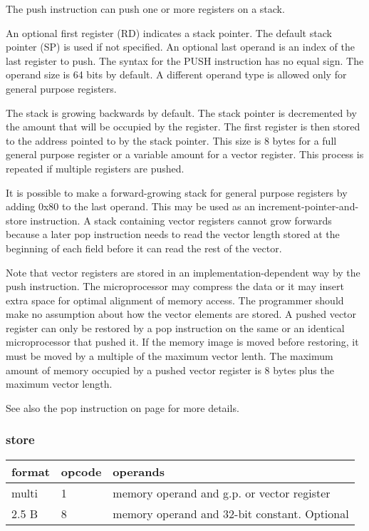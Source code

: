 \documentclass[forwardcom.tex]{subfiles}
\begin{document}
The push instruction can push one or more registers on a stack. 
\vspace{2mm}

An optional first register (RD) indicates a stack pointer. The default stack pointer (SP) is used if not specified. An optional last operand is an index of the last register to push. The syntax for the PUSH instruction has no equal sign. The operand size is 64 bits by default. A different operand type is allowed only for general purpose registers.
\vspace{2mm}

The stack is growing backwards by default. 
The stack pointer is decremented by the amount that will be occupied by the register. The first register is then stored to the address pointed to by the stack pointer. This size is 8 bytes for a full general purpose register or a variable amount for a vector register. This process is repeated if multiple registers are pushed.
\vspace{2mm}

It is possible to make a forward-growing stack for general purpose registers by adding 0x80 to the last operand. This may be used as an increment-pointer-and-store instruction. A stack containing vector registers cannot grow forwards because a later pop instruction needs to read the vector length stored at the beginning of each field before it can read the rest of the vector.
\vspace{2mm}

Note that vector registers are stored in an implementation-dependent way by the push instruction. The microprocessor may compress the data or it may insert extra space for optimal alignment of memory access. The programmer should make no assumption about how the vector elements are stored. A pushed vector register can only be restored by a pop instruction on the same or an identical microprocessor that pushed it. If the memory image is moved before restoring, it must be moved by a multiple of the maximum vector lenth. The maximum amount of memory occupied by a pushed vector register is 8 bytes plus the maximum vector length.
\vspace{2mm}

See also the pop instruction on page \pageref{table:popInstruction} for more details.
\vspace{2mm}


\subsubsection{store}
\label{table:storeInstruction}
\begin{tabular}{|p{12mm}|p{12mm}|p{110mm}|}
\hline
\bfseries format & \bfseries opcode & \bfseries operands \\ \hline
multi &  1 & memory operand and g.p. or vector register \\ \hline
2.5 B &  8 & memory operand and 32-bit constant. Optional \\ \hline
\end{tabular}
\vspace{2mm}
\end{document}
